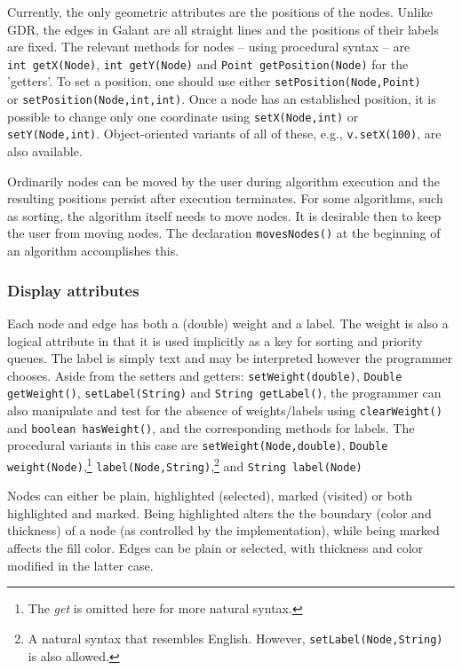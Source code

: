 Currently, the only geometric attributes are the positions of the
nodes. 
Unlike GDR, the edges in Galant
are all straight lines and the positions of their labels are fixed.
The relevant methods for nodes -- using procedural syntax -- are
\texttt{int~getX(Node)}, \texttt{int~getY(Node)}
and \texttt{Point~getPosition(Node)}
for the 'getters'. To set a position,
one should use either
\texttt{setPosition(Node,Point)}\\
or \texttt{setPosition(Node,int,int)}.
Once a node has an established position, it is possible to change
only one coordinate using \texttt{setX(Node,int)} or \texttt{setY(Node,int)}.
Object-oriented variants of all of these, e.g.,
\texttt{v.setX(100)}, are also available.

Ordinarily nodes can be moved by the user during algorithm execution
and the resulting positions persist after execution terminates.
For some algorithms, such as sorting, the algorithm itself needs to move
nodes.
It is desirable then to keep the user from moving nodes.
The declaration \texttt{movesNodes()} at the beginning of an algorithm
accomplishes this.

\subsubsection{Display attributes} \label{sec:display_attributes}

Each node and edge has
both a (double) weight and a label.
The weight
is also a logical
attribute in that
it is used implicitly as a
key for
sorting and priority queues.
The label is simply text and may be interpreted however the programmer
chooses.
Aside from the setters and getters: \texttt{setWeight(double)},
\mbox{\texttt{Double getWeight()}}, \texttt{setLabel(String)}
and \mbox{\texttt{String getLabel()}}, the programmer can also
manipulate and test for the absence of weights/labels using
\texttt{clearWeight()} and \texttt{boolean~hasWeight()},
and the corresponding methods for labels.
The procedural variants in this case are
\texttt{setWeight(Node,double)},
\mbox{\texttt{Double weight(Node)}},\footnote{
  The \emph{get} is omitted here for more natural syntax.}
\texttt{label(Node,String)},\footnote{
  A natural syntax that resembles English. However,
  \texttt{setLabel(Node,String)} is also allowed.
}
and \mbox{\texttt{String label(Node)}}

Nodes can either be plain, highlighted (selected), marked (visited) or both highlighted and
marked.
Being highlighted alters the
the boundary (color and thickness) of a node (as controlled by the
implementation), while being marked affects the fill color.
Edges can be plain or selected, with thickness and color modified in the
latter case.

